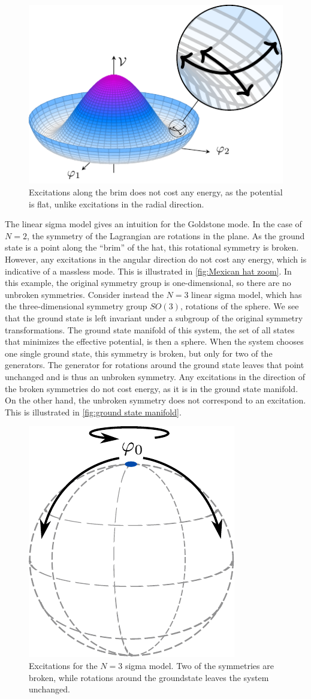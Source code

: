 \begin{figure}[ht]
    \centering
    \hspace*{2.5cm}
    \includegraphics[width=.6\linewidth]{figurer/mexican_hat_zoom.pdf}
    \caption{Excitations along the brim does not cost any energy, as the potential is flat, unlike excitations in the radial direction.}
    \label{fig:Mexican hat zoom}
\end{figure}

The linear sigma model gives an intuition for the Goldstone mode.
In the case of $N = 2$, the symmetry of the Lagrangian are rotations in the plane.
As the ground state is a point along the ``brim'' of the hat, this rotational symmetry is broken.
However, any excitations in the angular direction do not cost any energy, which is indicative of a massless mode.
This is illustrated in \autoref{fig:Mexican hat zoom}.
In this example, the original symmetry group is one-dimensional, so there are no unbroken symmetries.
Consider instead the $N=3$ linear sigma model, which has the three-dimensional symmetry group $SO(3)$, rotations of the sphere.
We see that the ground state is left invariant under a subgroup of the original symmetry transformations.
The ground state manifold of this system, the set of all states that minimizes the effective potential, is then a sphere.
When the system chooses one single ground state, this symmetry is broken, but only for two of the generators. 
The generator for rotations around the ground state leaves that point unchanged and is thus an unbroken symmetry.
Any excitations in the direction of the broken symmetries do not cost energy, as it is in the ground state manifold.
On the other hand, the unbroken symmetry does not correspond to an excitation.
This is illustrated in \autoref{fig:ground state manifold}.

\begin{figure}[h]
    \centering
    \includegraphics[width=.35\linewidth]{figurer/SU(3).pdf}
    \caption{Excitations for the $N=3$ sigma model. Two of the symmetries are broken, while rotations around the groundstate leaves the system unchanged.}
    \label{fig:ground state manifold}
\end{figure}
